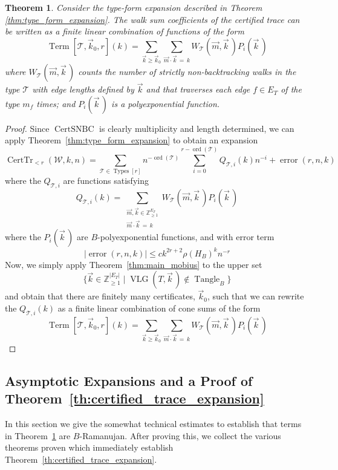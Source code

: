 \documentclass{memo-l}
\theoremstyle{plain}
\theoremstyle{definition}
\numberwithin{section}{chapter}
\numberwithin{equation}{chapter}
\DeclareMathOperator{\ord}{ord}
\DeclareMathOperator{\error}{error}
\DeclareMathOperator{\CertTr}{CertTr}
\DeclareMathOperator{\VLG}{VLG}
\DeclareMathOperator{\Tangle}{Tangle}
\DeclareMathOperator{\Types}{Types}
\DeclareMathOperator{\CertSNBC}{CertSNBC}
\DeclareMathOperator{\Term}{Term}
\theoremstyle{plain}
\newtheorem{thm}[theorem]{Theorem}
\theoremstyle{definition}
\newcommand\ZZ{\mathbb{Z}}
\newcommand\cT{\mathcal{T}}
\newcommand\cW{\mathcal{W}}
\begin{document}
\begin{thm}\label{thm:certified_walk_expression} Consider the type-form
expansion described in Theorem \ref{thm:type_form_expansion}. The walk sum
coefficients
of the certified trace can be written as a finite linear combination of
functions of the form \[ \Term [ \cT, \vec k_0, r ] (k) = \sum_{\vec k \geq
\vec k_0} \sum_{\vec m \cdot \vec k \,=\, k} W_\cT(\vec m, \vec k\,)
P_i(\vec k\,) \] where \( W_\cT(\vec m, \vec k\,) \) counts the number of
strictly non-backtracking walks in the type \( \cT \) with edge lengths
defined by \( \vec k \) and that traverses each edge \( f \in E_T \) of the
type \( m_f \) times; and \( P_i(\vec k\,) \) is a polyexponential
function.  
\end{thm} 
\begin{proof} Since \( \CertSNBC \) is clearly
multiplicity and length determined, we can apply
Theorem~\ref{thm:type_form_expansion} to obtain an expansion \[
\CertTr_{<r}(\cW,k,n) = \sum_{\cT \in \Types[r]} n^{-\ord(\cT)}
\sum_{i=0}^{r-\ord(\cT)} Q_{\cT,i}(k) n^{-i} + \error(r, n, k) \] where the
\( Q_{\cT,i} \) are functions satisfying \[ Q_{\cT,i}(k) =
\sum_{\substack{\vec m, \vec k \in \ZZ_{\geq 1}^{E_T} \\ \vec m \cdot \vec
k \,=\, k}} W_\cT(\vec m, \vec k\,) P_i(\vec k\,) \] where the \( P_i( \vec
k\,) \) are \(B\)-polyexponential functions, and with error term \[ |
\error(r,n,k) | \leq ck^{2r+2} \rho(H_B)^k n^{-r} \] Now, we simply apply
Theorem~\ref{thm:main_mobius} to the upper set \[ \{ \vec k \in \ZZ_{\geq
1}^{|E_T|} \mid \VLG(T, \vec k\,) \notin \Tangle_B \} \] and obtain that
there are finitely many certificates, \( \vec k_0 \), such that we can
rewrite the \( Q_{\cT,i}(k) \) as a finite linear combination of cone sums
of the form \[ \Term [ \cT, \vec k_0, r ] (k) = \sum_{\vec k \geq \vec k_0}
\sum_{\vec m \cdot \vec k \,=\, k} W_\cT(\vec m, \vec k\,) P_i(\vec k\,) \]
\end{proof}
%
%
%
%
\subsection{Asymptotic Expansions and a Proof of
Theorem~\ref{th:certified_trace_expansion}}
\label{sb:asymptotic_expansions}

In this section we give the somewhat technical estimates
to establish that terms in Theorem~\ref{thm:certified_walk_expression}
are $B$-Ramanujan.  After proving this,
we collect the various theorems proven which
immediately establish Theorem~\ref{th:certified_trace_expansion}.
\end{document}
